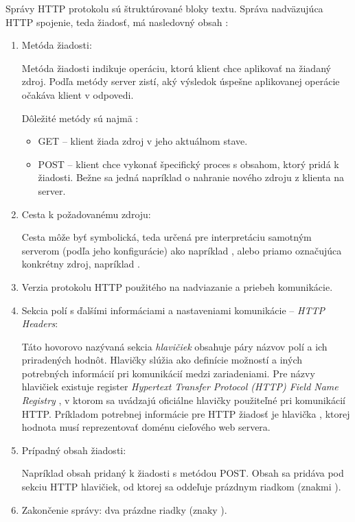 Správy HTTP protokolu sú štruktúrované bloky textu.
Správa nadväzujúca HTTP spojenie, teda žiadosť, má nasledovný obsah \cite{rfc7230, mdn-docs-http-overview}:
\begin{enumerate}
    \item Metóda žiadosti:

    Metóda žiadosti indikuje operáciu, ktorú klient chce aplikovať na žiadaný zdroj.
    Podľa metódy server zistí, aký výsledok úspešne aplikovanej operácie očakáva klient v odpovedi.

    \pagebreak

    Dôležité metódy sú najmä \cite{rfc9110}:
    \begin{itemize}
        \item GET -- klient žiada zdroj v jeho aktuálnom stave. 
        \item POST -- klient chce vykonať špecifický proces s obsahom, ktorý pridá k žiadosti. 
        Bežne sa jedná napríklad o nahranie nového zdroju z klienta na server.
    \end{itemize}
    
    \item Cesta k požadovanému zdroju:

    Cesta môže byť symbolická, teda určená pre interpretáciu samotným serverom (podľa jeho konfigurácie) ako napríklad , alebo priamo označujúca konkrétny zdroj, napríklad .
 
    \item Verzia protokolu HTTP použitého na nadviazanie a priebeh komunikácie.
    
    \item Sekcia polí s ďalšími informáciami a nastaveniami komunikácie -- \emph{HTTP Headers}:
    
    Táto hovorovo nazývaná sekcia \emph{hlavičiek} obsahuje páry názvov polí a ich priradených hodnôt. 
    Hlavičky slúžia ako definície možností a iných potrebných informácií pri komunikácií medzi zariadeniami.
    Pre názvy hlavičiek existuje register \textit{Hypertext Transfer Protocol (HTTP) Field Name Registry} \cite{rfc9110},
    v ktorom sa uvádzajú oficiálne hlavičky použiteľné pri komunikácií HTTP. 
    Príkladom potrebnej informácie pre HTTP žiadosť je hlavička , ktorej hodnota musí reprezentovať doménu cieľového web servera. 
    
    \item Prípadný obsah žiadosti:

    Napríklad obsah pridaný k žiadosti s metódou POST. 
    Obsah sa pridáva pod sekciu HTTP hlavičiek, od ktorej sa oddeľuje prázdnym riadkom (znakmi ).

    \item Zakončenie správy: dva prázdne riadky (znaky ).

\end{enumerate}

